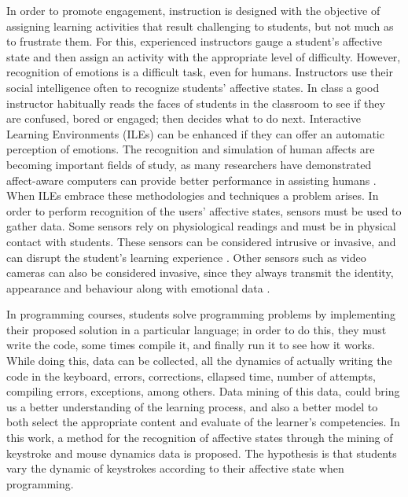 \documentclass[conference]{IEEEtran}
\begin{document}
In order to promote engagement, instruction is designed with the
objective of assigning learning activities
that result challenging to students, but not much as to frustrate them. For
this, experienced instructors gauge a student’s affective state and then assign
an activity with the appropriate level of difficulty. However, recognition of 
emotions is a difficult task, even
for humans. Instructors use their social intelligence often to recognize
students’ affective states. In class a good instructor habitually reads the
faces of students in the classroom to see if they are confused, bored or
engaged; then decides what to do next. Interactive Learning Environments (ILEs)
can be enhanced if they can offer an
automatic perception of emotions. The recognition and simulation of human
affects are becoming important fields of study, as many researchers have
demonstrated affect-aware computers can provide better performance in assisting
humans \cite{picard2001toward}. When ILEs embrace these methodologies and techniques a
problem arises. In order to perform recognition of the users' affective states,
sensors must be used to gather data. Some sensors rely on physiological readings
and must be in physical contact with students. These sensors can be considered
intrusive or invasive, and can disrupt the student’s learning experience 
\cite{zhai2008stress,sidney2005integrating,arroyo2009emotion}.
Other sensors such as video cameras can also be considered invasive, since they always transmit the
identity, appearance and behaviour along with emotional data \cite{picard2001toward}.

In programming courses, students solve programming problems by implementing their
proposed solution in a particular language; in order to do this, they must write the code,
some times compile it, and finally run it to see how it works. 
While doing this, data can be collected, all the dynamics of actually writing 
the code in the keyboard, errors, corrections, ellapsed time, number of attempts,
compiling errors, exceptions, among others. Data mining of this data, could
bring us a better understanding of the learning process, and also a better model to 
both select the appropriate content and evaluate of the learner’s competencies. 
In this work, a method for the recognition of affective states through the
mining of keystroke and mouse dynamics data is proposed. The hypothesis is that students vary the dynamic
of keystrokes according to their affective state when programming.
\end{document}
